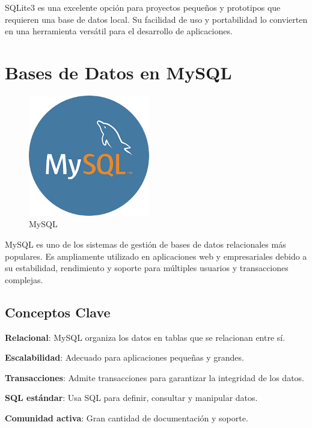 \documentclass[
  a4paper,
  DIV=11,
  numbers=noendperiod,
  onepage,
  openany]{scrreprt}
\begin{document}
SQLite3 es una excelente opción para proyectos pequeños y prototipos que
requieren una base de datos local. Su facilidad de uso y portabilidad lo
convierten en una herramienta versátil para el desarrollo de
aplicaciones.

\chapter{Bases de Datos en MySQL}\label{bases-de-datos-en-mysql}

\begin{figure}[H]

{\centering \includegraphics[width=2.08333in,height=\textheight,keepaspectratio]{unidades/unidad6/./images/mysql_logo.png}

}

\caption{MySQL}

\end{figure}%

MySQL es uno de los sistemas de gestión de bases de datos relacionales
más populares. Es ampliamente utilizado en aplicaciones web y
empresariales debido a su estabilidad, rendimiento y soporte para
múltiples usuarios y transacciones complejas.

\section{Conceptos Clave}\label{conceptos-clave-12}

\textbf{Relacional}: MySQL organiza los datos en tablas que se
relacionan entre sí.

\textbf{Escalabilidad}: Adecuado para aplicaciones pequeñas y grandes.

\textbf{Transacciones}: Admite transacciones para garantizar la
integridad de los datos.

\textbf{SQL estándar}: Usa SQL para definir, consultar y manipular
datos.

\textbf{Comunidad activa}: Gran cantidad de documentación y soporte.
\end{document}
